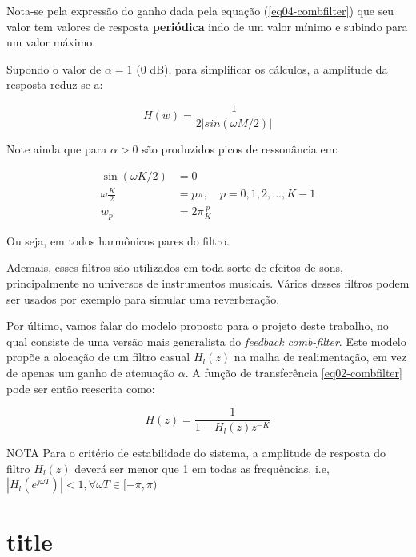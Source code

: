 		Nota-se pela expressão do ganho dada pela equação (\ref{eq04-combfilter}) que seu valor tem valores de resposta \textbf{periódica} indo de um valor mínimo e subindo para um valor máximo.
		
		Supondo o valor de $\alpha = 1$ ($0$ dB), para simplificar os cálculos, a amplitude da resposta reduz-se a:
		
		\begin{equation}
			\label{eq05-combfilter}
			H(w) = \frac{1}{2|sin(\omega M/2)|}
		\end{equation}

		Note ainda que para $\alpha > 0$ são produzidos picos de ressonância em:
		
		\begin{equation}
			\begin{aligned}
				\sin(\omega K/2) &= 0 \\
				\omega \frac{K}{2} &= p\pi,\quad p=0,1,2,...,K-1\\
				w_p &= 2\pi\frac{p}{K}
			\end{aligned}
		\end{equation}
		
		Ou seja, em todos harmônicos pares do filtro.
				
		Ademais, esses filtros são utilizados em toda sorte de efeitos de sons, principalmente no universos de instrumentos musicais. Vários desses filtros podem ser usados por exemplo para simular uma reverberação.
		
		Por último, vamos falar do modelo proposto para o projeto deste trabalho, no qual consiste de uma versão mais generalista do \textit{feedback comb-filter}. Este modelo propõe a alocação de um filtro casual $H_l(z)$ na malha de realimentação, em vez de apenas um ganho de atenuação $\alpha$. A função de transferência \ref{eq02-combfilter} pode ser então reescrita como:
		
		\begin{equation}
			H(z) = \frac{1}{1-H_l(z)z^{-K}}
		\end{equation}
		
		\begin{mymdframed}{NOTA}
			Para o critério de estabilidade do sistema, a amplitude de resposta do filtro $ H_l(z) $ deverá ser menor que 1 em todas as frequências, i.e, $ |H_l(e^{j\omega T})| < 1, \forall \omega T \in [-\pi,\pi)$
		\end{mymdframed}
		

\section{title}
		
